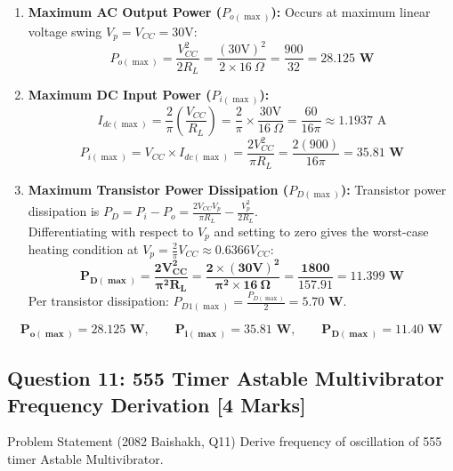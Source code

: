 \documentclass[11pt,a4paper,oneside]{book}
\begin{document}
\begin{enumerate}[leftmargin=1.5em]
  \item \textbf{Maximum AC Output Power ($P_{o(\max)}$):}
  Occurs at maximum linear voltage swing $V_p = V_{CC} = 30\text{V}$:
  \[
  P_{o(\max)} = \frac{V_{CC}^2}{2 R_L} = \frac{(30\text{V})^2}{2 \times 16\ \Omega} = \frac{900}{32} = \mathbf{28.125\text{ W}}
  \]
  \item \textbf{Maximum DC Input Power ($P_{i(\max)}$):}
  \[
  I_{dc(\max)} = \frac{2}{\pi} \left(\frac{V_{CC}}{R_L}\right) = \frac{2}{\pi} \times \frac{30\text{V}}{16\ \Omega} = \frac{60}{16\pi} \approx 1.1937\text{ A}
  \]
  \[
  P_{i(\max)} = V_{CC} \times I_{dc(\max)} = \frac{2 V_{CC}^2}{\pi R_L} = \frac{2(900)}{16\pi} = \mathbf{35.81\text{ W}}
  \]
  \item \textbf{Maximum Transistor Power Dissipation ($P_{D(\max)}$):}
  Transistor power dissipation is $P_D = P_i - P_o = \frac{2 V_{CC} V_p}{\pi R_L} - \frac{V_p^2}{2 R_L}$.\\
  Differentiating with respect to $V_p$ and setting to zero gives the worst-case heating condition at $V_p = \frac{2}{\pi} V_{CC} \approx 0.6366 V_{CC}$:
  \[
  \mathbf{P_{D(\max)} = \frac{2 V_{CC}^2}{\pi^2 R_L} = \frac{2 \times (30\text{V})^2}{\pi^2 \times 16\ \Omega} = \frac{1800}{157.91} = \mathbf{11.399\text{ W}}}
  \]
  Per transistor dissipation: $P_{D1(\max)} = \frac{P_{D(\max)}}{2} = \mathbf{5.70\text{ W}}$.
\end{enumerate}

\begin{answerbox}
$$\mathbf{P_{o(\max)} = 28.125\text{ W}, \qquad P_{i(\max)} = 35.81\text{ W}, \qquad P_{D(\max)} = 11.40\text{ W}}$$
\end{answerbox}

\vspace{0.6cm}

\subsection{Question 11: 555 Timer Astable Multivibrator Frequency Derivation [4 Marks]}
\begin{questionbox}{Problem Statement (2082 Baishakh, Q11)}
Derive frequency of oscillation of 555 timer Astable Multivibrator.
\end{questionbox}
\end{document}
